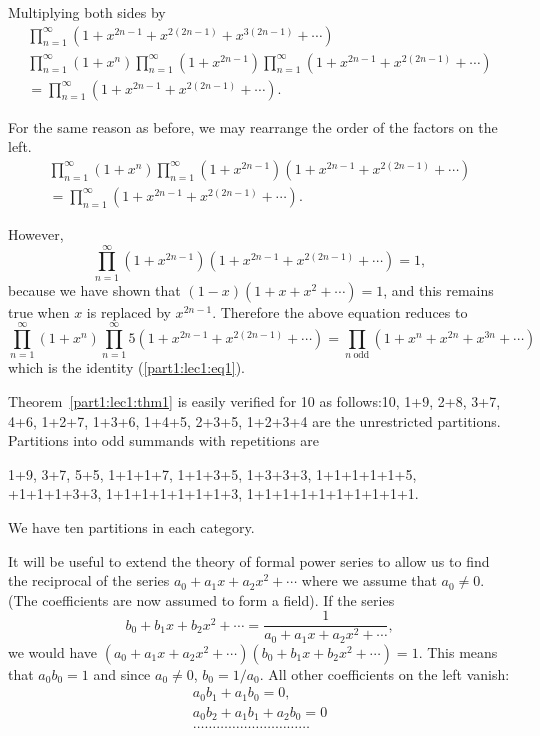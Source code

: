 Multiplying both sides by 
\begin{multline*}
  \prod\limits_{n=1}^\infty \left(1+x^{2n-1}+ x^{2(2n-1)} +
  x^{3(2n-1)}+ \cdots\right)\\
  \prod\limits_{n=1}^\infty \left(1+x^{n}\right) \prod\limits_{n=1}^\infty
  \left(1+x^{2n-1}\right) \prod\limits_{n=1}^\infty \left(1+x^{2n-1}+ x^{2(2n-1)}+
  \cdots\right)\\
  = \prod\limits_{n=1}^\infty \left(1+x^{2n-1}+x^{2(2n-1)}+ \cdots\right).
\end{multline*}

For the same reason as before, we may rearrange the order of the
factors on the left.
\begin{multline*}
  \prod\limits_{n=1}^\infty \left(1+x^{n}\right) \prod\limits_{n=1}^\infty
  \left(1+x^{2n-1}\right) \left( 1+x^{2n-1} + x^{2(2n-1)} + \cdots \right)\\
  = \prod\limits_{n=1}^\infty \left(1+x^{2n-1}+x^{2(2n-1)}+ \cdots\right).
\end{multline*}

However, 
$$
  \prod\limits_{n=1}^\infty \left(1+x^{2n-1}\right) 
  \left(1+x^{2n-1}+x^{2(2n-1)}+\cdots \right)=1,
$$
because we have shown that $(1-x) (1+x+x^2+ \cdots) =1$, and this
remains true when $x$ is replaced by $x^{2n-1}$. Therefore the above
equation reduces to 
$$
  \prod\limits_{n=1}^\infty \left(1+x^{n}\right) \prod\limits_{n=1}^\infty
5  \left(1+x^{2n-1}+x^{2(2n-1)} +\cdots \right)
  = \prod\limits_{n~\text{odd}} \left(1+x^{n} + x^{2n}+x^{3n}+ \cdots\right)
$$
which is the identity (\ref{part1:lec1:eq1}). 

Theorem\pageoriginale\  \ref{part1:lec1:thm1} is easily verified for 10 as follows:10, 1+9, 2+8, 3+7, 4+6,
1+2+7, 1+3+6, 1+4+5, 2+3+5, 1+2+3+4 are the unrestricted
partitions. Partitions into odd summands with repetitions are 

1+9, 3+7, 5+5, 1+1+1+7, 1+1+3+5, 1+3+3+3, 1+1+1+1+1+5, +1+1+1+3+3, 1+1+1+1+1+1+1+3, 1+1+1+1+1+1+1+1+1+1.

We have ten partitions in each category.

It will be useful to extend the theory of formal power series to allow
us to find the reciprocal of the series $a_0+a_1x+ a_2x^2+\cdots$
where we assume that $a_0\neq 0$. (The coefficients are now assumed to
form a field). If the series
$$
b_0 + b_1 x+ b_2x^2 + \cdots = \frac{1}{a_0 +a_1x+ a_2x^2+\cdots},
$$
we would have $(a_0 + a_1 x+ a_2 x^2+ \cdots) (b_0+b_1x+ b_2x^2 +
\cdots)=1$. This means that $a_0b_0=1$ and since $a_0\neq 0$,
$b_0=1/a_0$. All other coefficients on the left vanish:
\begin{gather*}
a_0 b_1 + a_1 b_0 =0,\\
a_0 b_2+a_1b_1+ a_2b_0=0\\
\dots\dots\dots\dots\dots\dots\dots\dots\dots\dots
\end{gather*}

